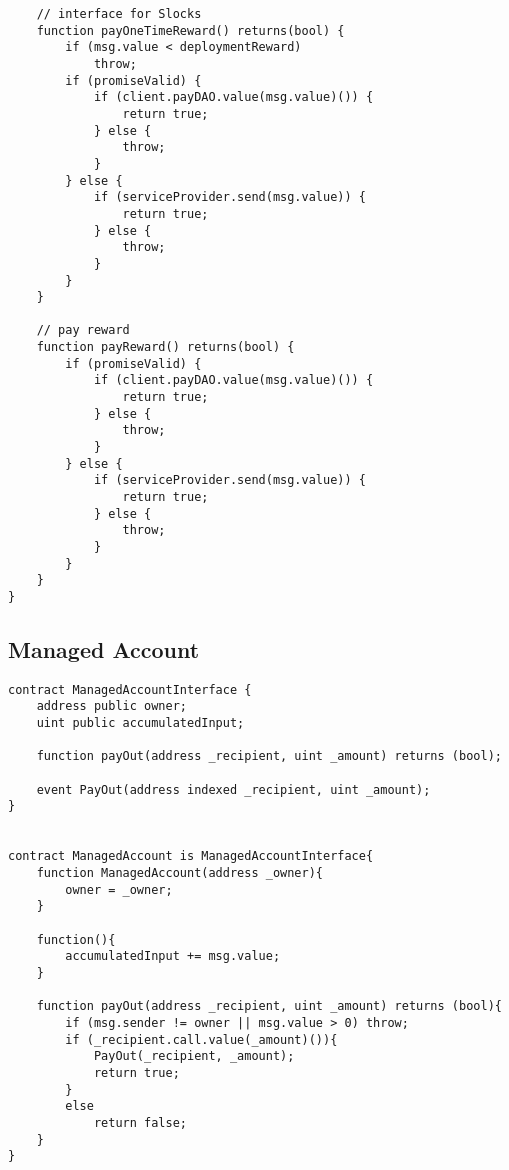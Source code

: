 \documentclass[9pt,oneside]{amsart}
\begin{document}
\begin{appendix}
\begin{verbatim}
    // interface for Slocks
    function payOneTimeReward() returns(bool) {
        if (msg.value < deploymentReward)
            throw;
        if (promiseValid) {
            if (client.payDAO.value(msg.value)()) {
                return true;
            } else {
                throw;
            }
        } else {
            if (serviceProvider.send(msg.value)) {
                return true;
            } else {
                throw;
            }
        }
    }

    // pay reward
    function payReward() returns(bool) {
        if (promiseValid) {
            if (client.payDAO.value(msg.value)()) {
                return true;
            } else {
                throw;
            }
        } else {
            if (serviceProvider.send(msg.value)) {
                return true;
            } else {
                throw;
            }
        }
    }
}
\end{verbatim}


\subsection{Managed Account}\label{app:ManagedAccount}
\begin{verbatim}
contract ManagedAccountInterface {
    address public owner;
    uint public accumulatedInput;

    function payOut(address _recipient, uint _amount) returns (bool);

    event PayOut(address indexed _recipient, uint _amount);
}


contract ManagedAccount is ManagedAccountInterface{
    function ManagedAccount(address _owner){
        owner = _owner;
    }

    function(){
        accumulatedInput += msg.value;
    }

    function payOut(address _recipient, uint _amount) returns (bool){
        if (msg.sender != owner || msg.value > 0) throw;
        if (_recipient.call.value(_amount)()){
            PayOut(_recipient, _amount);
            return true;
        }
        else
            return false;
    }
}
\end{verbatim}
\end{appendix}
\end{document}
